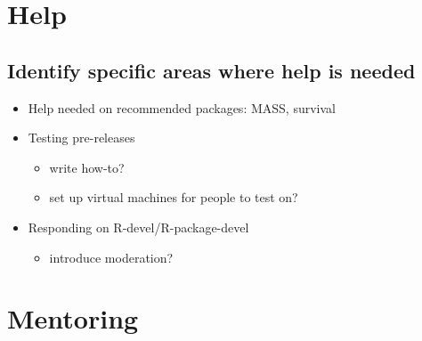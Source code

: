 \documentclass[]{book}
\providecommand{\tightlist}{%
  \setlength{\itemsep}{0pt}\setlength{\parskip}{0pt}}
\begin{document}
\hypertarget{help}{%
\chapter{Help}\label{help}}

\hypertarget{identify-specific-areas-where-help-is-needed}{%
\section{Identify specific areas where help is needed}\label{identify-specific-areas-where-help-is-needed}}

\begin{itemize}
\tightlist
\item
  Help needed on recommended packages: MASS, survival
\item
  Testing pre-releases

  \begin{itemize}
  \tightlist
  \item
    write how-to?
  \item
    set up virtual machines for people to test on?
  \end{itemize}
\item
  Responding on R-devel/R-package-devel

  \begin{itemize}
  \tightlist
  \item
    introduce moderation?
  \end{itemize}
\end{itemize}

\hypertarget{mentoring}{%
\chapter{Mentoring}\label{mentoring}}
\end{document}
